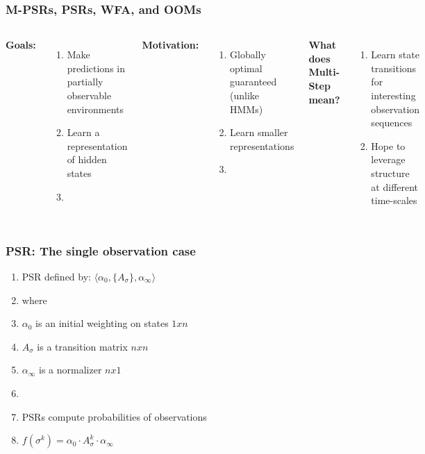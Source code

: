 \documentclass{beamer}
\begin{document}
\begin{frame}
\frametitle{M-PSRs, PSRs, WFA, and OOMs}
\begin{columns}[c] %

\textbf{Goals:}
\begin{enumerate}
\item Make predictions in partially observable environments 
\item Learn a representation of hidden states
\item[]
\end{enumerate}

\textbf{Motivation:}
\begin{enumerate}
\item Globally optimal guaranteed (unlike HMMs)
\item Learn smaller representations
\item[]

\end{enumerate}

\textbf{What does Multi-Step mean?}
\begin{enumerate}
\item Learn state transitions for interesting observation sequences
\item Hope to leverage structure at different time-scales

\end{enumerate}

\end{columns}
\end{frame}


\begin{frame}
\frametitle{PSR: The single observation case}

\begin{enumerate}
\item PSR defined by: $\langle \alpha_0, \{A_\sigma\},\alpha_\infty \rangle$
\item[] where
\item[] $\alpha_0$ is an initial weighting on states $1xn$
\item[] $A_\sigma$ is a transition matrix $nxn$
\item[] $\alpha_\infty$ is a normalizer $nx1$
\item[]
\item PSRs compute probabilities of observations

\item[] $f(\sigma^k) = \alpha_0 \cdot A_\sigma^k \cdot \alpha_\infty$

\end{enumerate}

\end{frame}
\end{document}
